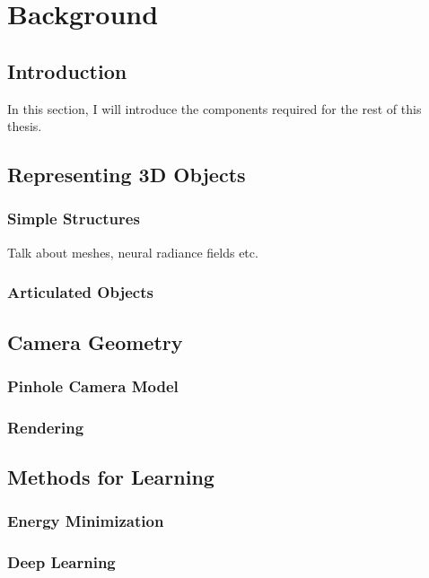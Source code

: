 
\chapter{Background}

\ifpdf
    \graphicspath{{Chapter2/Figs/Raster/}{Chapter2/Figs/PDF/}{Chapter2/Figs/}}
\else
    \graphicspath{{Chapter2/Figs/Vector/}{Chapter2/Figs/}}
\fi

\section{Introduction}

In this section, I will introduce the components required for the rest of this thesis.

\section{Representing 3D Objects}

\subsection{Simple Structures}
Talk about meshes, neural radiance fields etc.

\subsection{Articulated Objects}

\section{Camera Geometry}

\subsection{Pinhole Camera Model}

\subsection{Rendering}

\section{Methods for Learning}

\subsection{Energy Minimization}

\subsection{Deep Learning}




